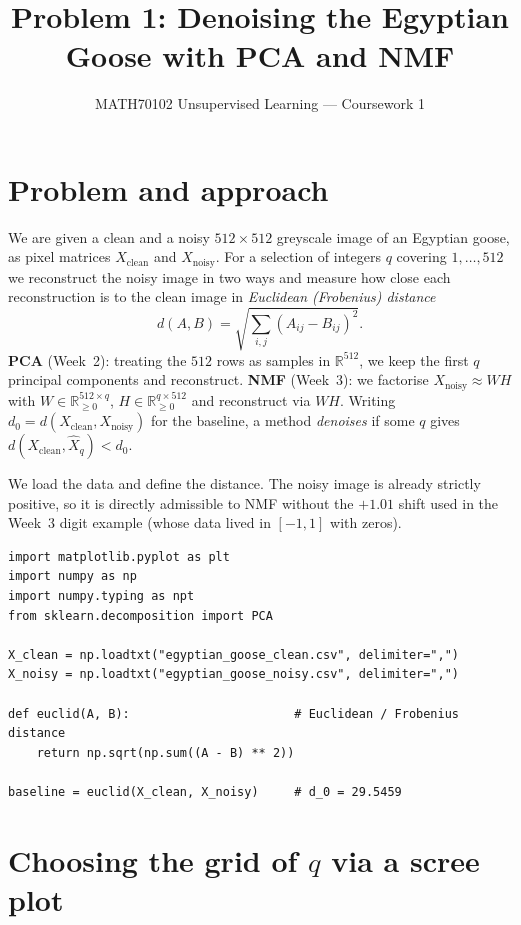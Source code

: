 \documentclass[10pt,a4paper]{article}
\title{\vspace{-1.2cm}\textbf{Problem 1: Denoising the Egyptian Goose with PCA and NMF}}
\author{MATH70102 Unsupervised Learning --- Coursework 1}
\date{}
\begin{document}
\maketitle
\vspace{-0.9cm}

\section{Problem and approach}

We are given a clean and a noisy $512\times512$ greyscale image of an Egyptian goose, as pixel matrices $X_{\text{clean}}$ and $X_{\text{noisy}}$. For a selection of integers $q$ covering $1,\dots,512$ we reconstruct the noisy image in two ways and measure how close each reconstruction is to the clean image in \emph{Euclidean (Frobenius) distance}
\[
  d(A,B)=\sqrt{\textstyle\sum_{i,j}(A_{ij}-B_{ij})^2}.
\]
\textbf{PCA} (Week~2): treating the $512$ rows as samples in $\mathbb{R}^{512}$, we keep the first $q$ principal components and reconstruct. \textbf{NMF} (Week~3): we factorise $X_{\text{noisy}}\approx WH$ with $W\in\mathbb{R}^{512\times q}_{\ge 0}$, $H\in\mathbb{R}^{q\times 512}_{\ge 0}$ and reconstruct via $WH$. Writing $d_0=d(X_{\text{clean}},X_{\text{noisy}})$ for the baseline, a method \emph{denoises} if some $q$ gives $d(X_{\text{clean}},\hat X_q)<d_0$.

We load the data and define the distance. The noisy image is already strictly positive, so it is directly admissible to NMF without the $+1.01$ shift used in the Week~3 digit example (whose data lived in $[-1,1]$ with zeros).

\begin{lstlisting}
import matplotlib.pyplot as plt
import numpy as np
import numpy.typing as npt
from sklearn.decomposition import PCA

X_clean = np.loadtxt("egyptian_goose_clean.csv", delimiter=",")
X_noisy = np.loadtxt("egyptian_goose_noisy.csv", delimiter=",")

def euclid(A, B):                       # Euclidean / Frobenius distance
    return np.sqrt(np.sum((A - B) ** 2))

baseline = euclid(X_clean, X_noisy)     # d_0 = 29.5459
\end{lstlisting}

\section{Choosing the grid of \texorpdfstring{$q$}{q} via a scree plot}
\end{document}
